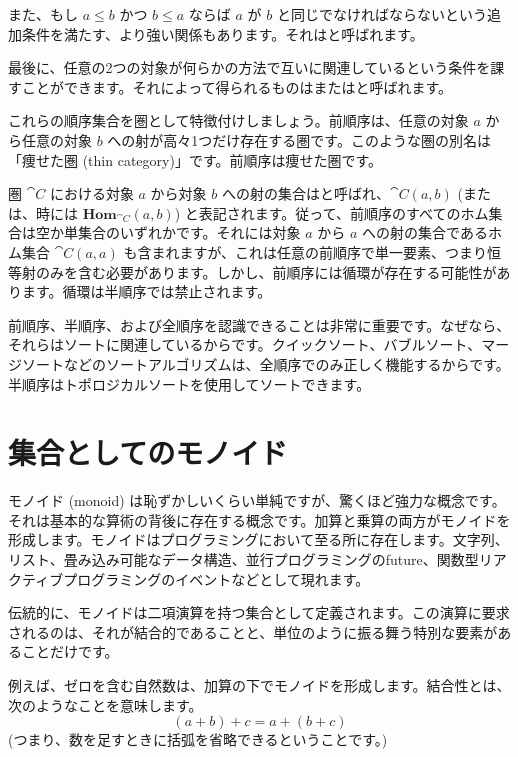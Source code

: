 また、もし \(a \leqslant b\) かつ \(b \leqslant a\) ならば \(a\) が \(b\) と同じでなければならないという追加条件を満たす、より強い関係もあります。それはと呼ばれます。

最後に、任意の2つの対象が何らかの方法で互いに関連しているという条件を課すことができます。それによって得られるものはまたはと呼ばれます。

これらの順序集合を圏として特徴付けしましょう。前順序は、任意の対象 \(a\) から任意の対象 \(b\) への射が高々1つだけ存在する圏です。このような圏の別名は「痩せた圏 (thin category)」です。前順序は痩せた圏です。

圏 \(\cat{C}\) における対象 \(a\) から対象 \(b\) への射の集合はと呼ばれ、\(\cat{C}(a, b)\) (または、時には \(\mathbf{Hom}_{\cat{C}}(a, b)\)) と表記されます。従って、前順序のすべてのホム集合は空か単集合のいずれかです。それには対象 \(a\) から \(a\) への射の集合であるホム集合 \(\cat{C}(a, a)\) も含まれますが、これは任意の前順序で単一要素、つまり恒等射のみを含む必要があります。しかし、前順序には循環が存在する可能性があります。循環は半順序では禁止されます。

前順序、半順序、および全順序を認識できることは非常に重要です。なぜなら、それらはソートに関連しているからです。クイックソート、バブルソート、マージソートなどのソートアルゴリズムは、全順序でのみ正しく機能するからです。半順序はトポロジカルソートを使用してソートできます。

\section{集合としてのモノイド}

モノイド (monoid) は恥ずかしいくらい単純ですが、驚くほど強力な概念です。それは基本的な算術の背後に存在する概念です。加算と乗算の両方がモノイドを形成します。モノイドはプログラミングにおいて至る所に存在します。文字列、リスト、畳み込み可能なデータ構造、並行プログラミングのfuture、関数型リアクティブプログラミングのイベントなどとして現れます。

伝統的に、モノイドは二項演算を持つ集合として定義されます。この演算に要求されるのは、それが結合的であることと、単位のように振る舞う特別な要素があることだけです。

例えば、ゼロを含む自然数は、加算の下でモノイドを形成します。結合性とは、次のようなことを意味します。
\[(a + b) + c = a + (b + c)\]
(つまり、数を足すときに括弧を省略できるということです。) 

